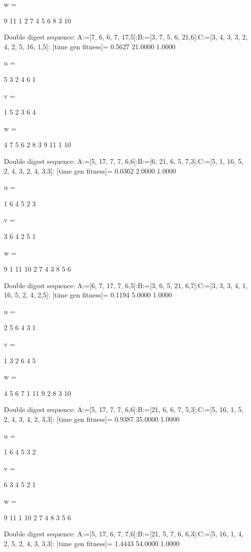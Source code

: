 w =

     9    11     1     2     7     4     5     6     8     3    10

Double digest sequence:
A:=[7, 6, 6, 7, 17,5]:B:=[3, 7, 5, 6, 21,6]:C:=[3, 4, 3, 3, 2, 4, 2, 5, 16, 1,5]:
[time gen fitness]=
    0.5627   21.0000    1.0000


u =

     5     3     2     4     6     1


v =

     1     5     2     3     6     4


w =

     4     7     5     6     2     8     3     9    11     1    10

Double digest sequence:
A:=[5, 17, 7, 7, 6,6]:B:=[6, 21, 6, 5, 7,3]:C:=[5, 1, 16, 5, 2, 4, 3, 2, 4, 3,3]:
[time gen fitness]=
    0.0362    2.0000    1.0000


u =

     1     6     4     5     2     3


v =

     3     6     4     2     5     1


w =

     9     1    11    10     2     7     4     3     8     5     6

Double digest sequence:
A:=[6, 7, 17, 7, 6,5]:B:=[3, 6, 5, 21, 6,7]:C:=[3, 3, 3, 4, 1, 16, 5, 2, 4, 2,5]:
[time gen fitness]=
    0.1194    5.0000    1.0000


u =

     2     5     6     4     3     1


v =

     1     3     2     6     4     5


w =

     4     5     6     7     1    11     9     2     8     3    10

Double digest sequence:
A:=[5, 17, 7, 7, 6,6]:B:=[21, 6, 6, 7, 5,3]:C:=[5, 16, 1, 5, 2, 4, 3, 4, 2, 3,3]:
[time gen fitness]=
    0.9387   35.0000    1.0000


u =

     1     6     4     5     3     2


v =

     6     3     4     5     2     1


w =

     9    11     1    10     2     7     4     8     3     5     6

Double digest sequence:
A:=[5, 17, 6, 7, 7,6]:B:=[21, 5, 7, 6, 6,3]:C:=[5, 16, 1, 4, 2, 5, 2, 4, 3, 3,3]:
[time gen fitness]=
    1.4443   54.0000    1.0000


